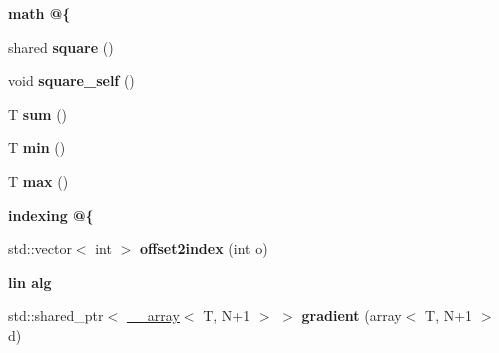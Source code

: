 \begin{Indent}{\bf math @\{}\par
{\em \label{_amgrpe9ff367b69dd3dff64e14cb45d1def75}
 }\begin{DoxyCompactItemize}
\item 
\hypertarget{class____array_a566abb01d09bf563edf9f7f761b4317d}{
shared {\bfseries square} ()}
\label{class____array_a566abb01d09bf563edf9f7f761b4317d}

\item 
\hypertarget{class____array_ad6e7fc66551df684d4337929b8636446}{
void {\bfseries square\_\-self} ()}
\label{class____array_ad6e7fc66551df684d4337929b8636446}

\item 
\hypertarget{class____array_acd4f2a6476211e9d948a0d8ae884a3cc}{
T {\bfseries sum} ()}
\label{class____array_acd4f2a6476211e9d948a0d8ae884a3cc}

\item 
\hypertarget{class____array_a2edfd07e97b1fdca31ad463f2ef9962f}{
T {\bfseries min} ()}
\label{class____array_a2edfd07e97b1fdca31ad463f2ef9962f}

\item 
\hypertarget{class____array_a9489124f312f9409853b9bf29b6dd585}{
T {\bfseries max} ()}
\label{class____array_a9489124f312f9409853b9bf29b6dd585}

\end{DoxyCompactItemize}
\end{Indent}
\begin{Indent}{\bf indexing @\{}\par
{\em \label{_amgrpb03795d8aada5c57702ba43410fed4a7}
 }\begin{DoxyCompactItemize}
\item 
\hypertarget{class____array_ab5755f3be1a48c4c62a12adc512dac16}{
std::vector$<$ int $>$ {\bfseries offset2index} (int o)}
\label{class____array_ab5755f3be1a48c4c62a12adc512dac16}

\end{DoxyCompactItemize}
\end{Indent}
\begin{Indent}{\bf lin alg}\par
{\em \label{_amgrpfa79411a4ff41c0c4ca3776577c7bf42}
 }\begin{DoxyCompactItemize}
\item 
\hypertarget{class____array_a0f07f0f2bfe9a0da0aa3744b0d48d390}{
std::shared\_\-ptr$<$ \hyperlink{class____array}{\_\-\_\-array}$<$ T, N+1 $>$ $>$ {\bfseries gradient} (array$<$ T, N+1 $>$ d)}
\label{class____array_a0f07f0f2bfe9a0da0aa3744b0d48d390}

\end{DoxyCompactItemize}
\end{Indent}
